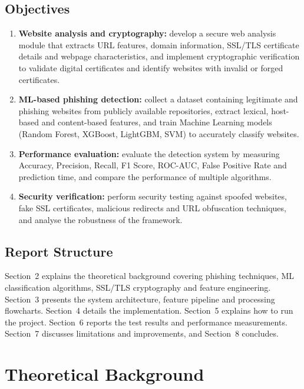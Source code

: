 \documentclass[11pt,a4paper]{article}
\begin{document}
\subsection{Objectives}

\begin{enumerate}
  \item \textbf{Website analysis and cryptography:} develop a secure web analysis module that extracts URL features, domain information, SSL/TLS certificate details and webpage characteristics, and implement cryptographic verification to validate digital certificates and identify websites with invalid or forged certificates.
  \item \textbf{ML-based phishing detection:} collect a dataset containing legitimate and phishing websites from publicly available repositories, extract lexical, host-based and content-based features, and train Machine Learning models (Random Forest, XGBoost, LightGBM, SVM) to accurately classify websites.
  \item \textbf{Performance evaluation:} evaluate the detection system by measuring Accuracy, Precision, Recall, F1 Score, ROC-AUC, False Positive Rate and prediction time, and compare the performance of multiple algorithms.
  \item \textbf{Security verification:} perform security testing against spoofed websites, fake SSL certificates, malicious redirects and URL obfuscation techniques, and analyse the robustness of the framework.
\end{enumerate}

\subsection{Report Structure}

Section~2 explains the theoretical background covering phishing techniques, ML classification algorithms, SSL/TLS cryptography and feature engineering. Section~3 presents the system architecture, feature pipeline and processing flowcharts. Section~4 details the implementation. Section~5 explains how to run the project. Section~6 reports the test results and performance measurements. Section~7 discusses limitations and improvements, and Section~8 concludes.

\clearpage
\section{Theoretical Background}
\end{document}
